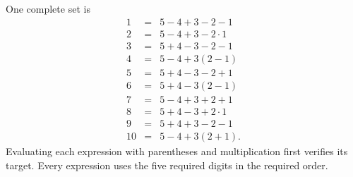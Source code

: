 One complete set is
\[\begin{array}{rcl}1&=&5-4+3-2-1\\2&=&5-4+3-2\cdot1\\3&=&5+4-3-2-1\\4&=&5-4+3(2-1)\\5&=&5+4-3-2+1\\6&=&5+4-3(2-1)\\7&=&5-4+3+2+1\\8&=&5+4-3+2\cdot1\\9&=&5+4+3-2-1\\10&=&5-4+3(2+1).\end{array}\]
Evaluating each expression with parentheses and multiplication first verifies its target. Every expression uses the five required digits in the required order.
